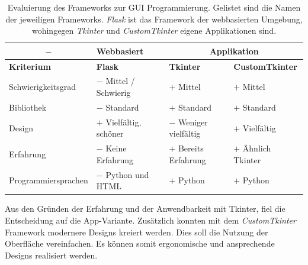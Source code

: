 \begin{table}[H]
    \centering
    \begin{tabular}{l|l|l|l}
        \multicolumn{1}{c|}{$-$}&   \textbf{Webbasiert}&        \multicolumn{2}{c}{\textbf{Applikation}}\\
        \hline
        \textbf{Kriterium}&         \textbf{Flask}&             \textbf{Tkinter}&           \textbf{CustomTkinter}\\
        \hline
        Schwierigkeitsgrad&         $-$ Mittel / Schwierig&     $+$ Mittel&                 $+$ Mittel\\
        Bibliothek&                 $-$ Standard&               $+$ Standard&               $+$ Standard\\
        Design&                     $+$ Vielfältig, schöner&    $-$ Weniger vielfältig&     $+$ Vielfältig\\
        Erfahrung&                  $-$ Keine Erfahrung&        $+$ Bereits Erfahrung&      $+$ Ähnlich Tkinter\\
        Programmiersprachen&        $-$ Python und HTML&        $+$ Python&                 $+$ Python\\
    \end{tabular}
    \caption{Evaluierung des Frameworks zur GUI Programmierung. Gelistet sind die Namen der jeweiligen Frameworks. \textit{Flask} ist das Framework der webbasierten Umgebung, wohingegen \textit{Tkinter} und \textit{CustomTkinter} eigene Applikationen sind.}
    \label{tab:gui_programming}
\end{table}

Aus den Gründen der Erfahrung und der Anwendbarkeit mit Tkinter, fiel die Entscheidung auf die App-Variante. Zusätzlich konnten mit dem \textit{CustomTkinter} Framework modernere Designs kreiert werden. Dies soll die Nutzung der Oberfläche vereinfachen. Es können somit ergonomische und ansprechende Designs realisiert werden.

